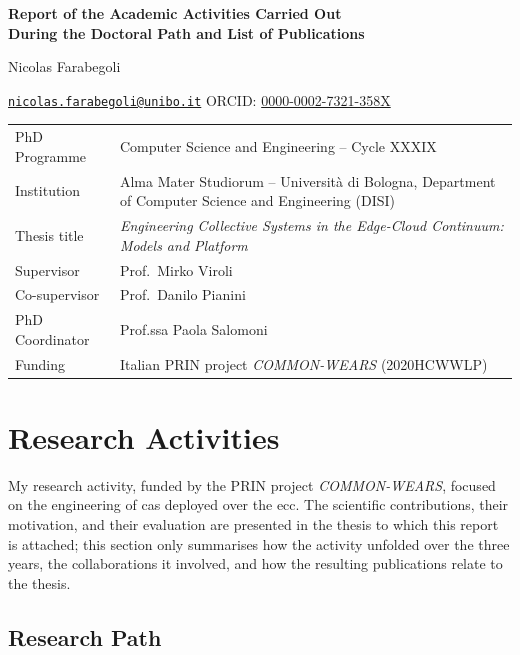 \documentclass[a4paper,11pt]{article}
\begin{document}
\begin{center}
  {\Large\bfseries Report of the Academic Activities Carried Out\\[2pt] During the Doctoral Path and List of Publications\par}
  \vspace{1.2em}
  {\large Nicolas Farabegoli\par}
  \vspace{0.2em}
  \href{mailto:nicolas.farabegoli@unibo.it}{\texttt{nicolas.farabegoli@unibo.it}}
  \quad ORCID: \href{https://orcid.org/0000-0002-7321-358X}{0000-0002-7321-358X}
\end{center}

\vspace{0.8em}
\noindent
\begin{tabularx}{\textwidth}{@{}lX@{}}
  \toprule
  PhD Programme & Computer Science and Engineering -- Cycle XXXIX \\
  Institution & Alma Mater Studiorum -- Università di Bologna, Department of Computer Science and Engineering (DISI) \\
  Thesis title & \emph{Engineering Collective Systems in the Edge-Cloud Continuum: Models and Platform} \\
  Supervisor & Prof.\ Mirko Viroli \\
  Co-supervisor & Prof.\ Danilo Pianini \\
  PhD Coordinator & Prof.ssa Paola Salomoni \\
  Funding & Italian PRIN project \emph{COMMON-WEARS} (2020HCWWLP) \\
  \bottomrule
\end{tabularx}

\section{Research Activities}
\label{sec:research}

My research activity, funded by the PRIN project \emph{COMMON-WEARS}, focused on the engineering of \ac{cas} deployed over the \ac{ecc}.
%
The scientific contributions, their motivation, and their evaluation are presented in the thesis to which this report is attached;
this section only summarises how the activity unfolded over the three years, the collaborations it involved, and how the resulting publications relate to the thesis.

\subsection{Research Path}
\label{sec:path}
\end{document}
